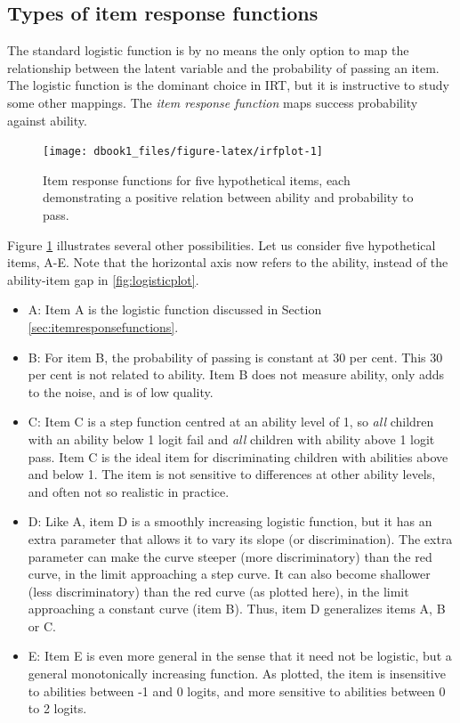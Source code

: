 \documentclass[
]{book}
\providecommand{\tightlist}{%
  \setlength{\itemsep}{0pt}\setlength{\parskip}{0pt}}
\begin{document}
\hypertarget{types-of-item-response-functions}{%
\subsection{Types of item response functions}\label{types-of-item-response-functions}}

The standard logistic function is by no means the only option to map the relationship between the latent variable and the probability of passing an item. The logistic function is the dominant choice in IRT, but it is instructive to study some other mappings. The \emph{item response function} maps success probability against ability.

\begin{figure}

{\centering \texttt{[image: dbook1\_files/figure-latex/irfplot-1]} 

}

\caption{Item response functions for five hypothetical items, each demonstrating a positive relation between ability and probability to pass.}\label{fig:irfplot}
\end{figure}



Figure \ref{fig:irfplot} illustrates several other possibilities. Let us consider five hypothetical items, A-E. Note that the horizontal axis now refers to the ability, instead of the ability-item gap in \ref{fig:logisticplot}.

\begin{itemize}
\tightlist
\item
  A: Item A is the logistic function discussed in Section \ref{sec:itemresponsefunctions}.
\item
  B: For item B, the probability of passing is constant at 30 per cent. This 30 per cent is not related to ability. Item B does not measure ability, only adds to the noise, and is of low quality.
\item
  C: Item C is a step function centred at an ability level of 1, so \emph{all} children with an ability below 1 logit fail and \emph{all} children with ability above 1 logit pass. Item C is the ideal item for discriminating children with abilities above and below 1. The item is not sensitive to differences at other ability levels, and often not so realistic in practice.
\item
  D: Like A, item D is a smoothly increasing logistic function, but it has an extra parameter that allows it to vary its slope (or discrimination). The extra parameter can make the curve steeper (more discriminatory) than the red curve, in the limit approaching a step curve. It can also become shallower (less discriminatory) than the red curve (as plotted here), in the limit approaching a constant curve (item B). Thus, item D generalizes items A, B or C.
\item
  E: Item E is even more general in the sense that it need not be logistic, but a general monotonically increasing function. As plotted, the item is insensitive to abilities between -1 and 0 logits, and more sensitive to abilities between 0 to 2 logits.
\end{itemize}
\end{document}
